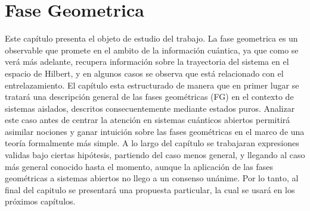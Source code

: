 \chapter{Fase Geometrica}
\label{ch:fg}

\pagestyle{fancy}
\fancyhf{}
\fancyhead[LE]{\nouppercase{\rightmark\hfill}}
\fancyhead[RO]{\nouppercase{\leftmark\hfill}}
\fancyfoot[LE,RO]{\hfill\thepage\hfill}

Este cap\'itulo presenta el objeto de estudio del trabajo. La fase geometrica es un observable que promete en el ambito de la informaci\'on cu\'antica, ya que como se ver\'a m\'as adelante, recupera informaci\'on sobre la trayectoria del sistema en el espacio de Hilbert, y en algunos casos se observa que est\'a relacionado con el entrelazamiento. 
El cap\'itulo esta estructurado de manera que en primer lugar se tratar\'a una descripción general de las fases geom\'etricas (FG) en el contexto de sistemas aislados, descritos consecuentemente mediante estados puros. Analizar este caso antes de centrar la atención en sistemas cuánticos abiertos permitirá asimilar nociones y ganar intuición sobre las fases geométricas en el marco de una teoría formalmente más simple. A lo largo del capítulo se trabajaran expresiones validas bajo ciertas hipótesis, partiendo del caso menos general, y llegando al caso más general conocido hasta el momento, aunque la aplicación de las fases geométricas a sistemas abiertos no llego a un consenso unánime. Por lo tanto, al final del capitulo se presentará una propuesta particular, la cual se usará en los próximos capítulos.

